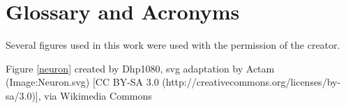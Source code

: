 \chapter{Glossary and Acronyms}
\label{app_credits}

Several figures used in this work were used with the permission of the creator.

Figure \ref{neuron} created by Dhp1080, svg adaptation by Actam (Image:Neuron.svg) [CC BY-SA 3.0 (http://creativecommons.org/licenses/by-sa/3.0)], via Wikimedia Commons

